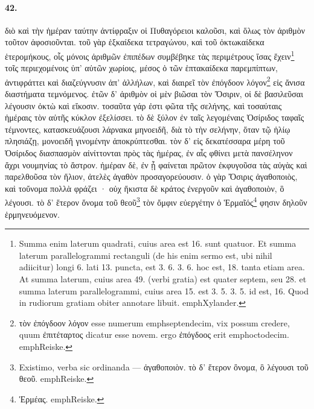\documentclass[a4paper, 11pt, oneside, polutonikogreek, german]{article}
\begin{document}
\paragraph{42.}
διὸ καὶ τὴν ἡμέραν ταύτην ἀντίφραξιν οἱ Πυθαγόρειοι καλοῦσι, καὶ ὅλως τὸν ἀριθμὸν τοῦτον ἀφοσιοῦνται. τοῦ γὰρ ἑξκαίδεκα τετραγώνου, καὶ τοῦ ὀκτωκαίδεκα ἑτερομήκους, οἷς μόνοις ἀριθμῶν ἐπιπέδων συμβέβηκε τὰς περιμέτρους ἴσας ἔχειν\footnote{Summa enim laterum quadrati, cuius area est 16. sunt quatuor. Et summa laterum parallelogrammi rectanguli (de his enim sermo est, ubi nihil adiicitur) longi 6. lati 13. puncta, est 3. 6. 3. 6. hoc est, 18. tanta etiam area. At summa laterum, cuius area 49. (verbi gratia) est quater septem, seu 28. et summa laterum parallelogrammi, cuius area 15. est 3. 5. 3. 5. id est, 16. Quod in rudiorum gratiam obiter annotare libuit. emph{Xylander.}} τοῖς περιεχομένοις ὑπ' αὐτῶν χωρίοις, μέσος ὁ τῶν ἑπτακαίδεκα παρεμπίπτων, ἀντιφράττει καὶ διαζεύγνυσιν ἀπ' ἀλλήλων, καὶ διαιρεῖ τὸν ἐπόγδοον λόγον\footnote{τὸν ἐπόγδοον λόγον esse numerum emph{septendecim}, vix possum credere, quum ἐπιτέταρτος dicatur esse novem. ergo ἐπόγδοος erit emph{octodecim}. emph{Reiske.} } εἰς ἄνισα διαστήματα τεμνόμενος. ἐτῶν δ' ἀριθμὸν οἱ μὲν βιῶσαι τὸν Ὄσιριν, οἱ δὲ βασιλεῦσαι λέγουσιν ὀκτὼ καὶ εἴκοσιν. τοσαῦτα γάρ ἐστι φῶτα τῆς σελήνης, καὶ τοσαύταις ἡμέραις τὸν αὐτῆς κύκλον ἐξελίσσει. τὸ δὲ ξύλον ἐν ταῖς λεγομέναις Ὀσίριδος ταφαῖς τέμνοντες, κατασκευάζουσι λάρνακα μηνοειδῆ, διὰ τὸ τὴν σελήνην, ὅταν τῷ ἡλίῳ πλησιάζῃ, μονοειδῆ γινομένην ἀποκρύπτεσθαι. τὸν δ' εἰς δεκατέσσαρα μέρη τοῦ Ὀσίριδος διασπασμὸν αἰνίττονται πρὸς τὰς ἡμέρας, ἐν αἷς φθίνει μετὰ πανσέληνον ἄχρι νουμηνίας τὸ ἄστρον. ἡμέραν δὲ, ἐν ᾗ φαίνεται πρῶτον ἐκφυγοῦσα τὰς αὐγὰς καὶ παρελθοῦσα τὸν ἥλιον, ἀτελὲς ἀγαθὸν προσαγορεύουσιν. ὁ γὰρ Ὄσιρις ἀγαθοποιὸς, καὶ τοὔνομα πολλὰ φράζει · οὐχ ἥκιστα δὲ κράτος ἐνεργοῦν καὶ ἀγαθοποιὸν, ὃ λέγουσι. τὸ δ' ἕτερον ὄνομα τοῦ θεοῦ\footnote{Existimo, verba sic ordinanda --- ἀγαθοποιὸν. τὸ δ' ἕτερον ὂνομα, ὃ λέγουσι τοῦ θεοῦ. emph{Reiske.}} τὸν ὄμφιν εὐεργέτην ὁ Ἑρμαῖός\footnote{Ἑρμέας. emph{Reiske.}} φησιν δηλοῦν ἑρμηνευόμενον.
\end{document}
